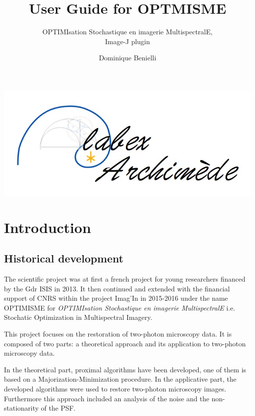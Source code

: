 \documentclass[12pt, a4paper]{scrartcl}
\begin{document}
\author{Dominique Benielli}
\title{User Guide for OPTMISME}
\subtitle{OPTIMIsation Stochastique en imagerie MultispectralE,\\ Image-J plugin}

\maketitle
\begin{center}
\includegraphics[scale=0.2]{images/logo_labex.jpeg}
\end{center}
\tableofcontents                  %


\section{Introduction}
\subsection{Historical development}
The scientific project was at first a french project for young researchers financed by the Gdr ISIS in 2013.
It then continued and extended with the financial support of CNRS within the project Imag'In in 2015-2016 under the name OPTIMISME for \emph{OPTIMIsation Stochastique en imagerie MultispectralE} i.e. Stochatic Optimization in Multispectral Imagery.

This project focuses on the restoration of two-photon microscopy data. It is composed of two parts: a theoretical approach and its application to two-photon microscopy data.

In the theoretical part, proximal algorithms have been developed, one of them is based on a Majorization-Minimization procedure.
In the applicative part, the developed algorithms were used to  restore two-photon  microscopy images. 
Furthermore this approach included an analysis of the noise and the non-stationarity of the PSF.
\end{document}
